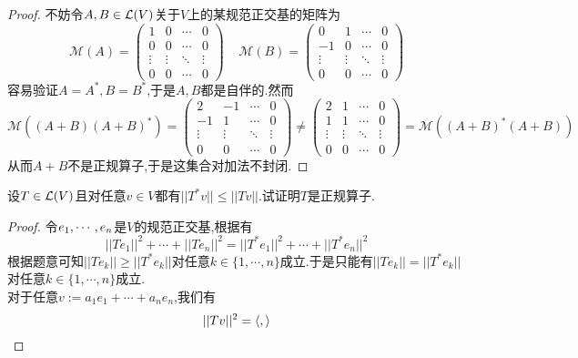 \documentclass{ctexart}
\begin{document}
\begin{proof}
    不妨令$A,B\in\mathcal{L}(V)$关于$V$上的某规范正交基的矩阵为
    \[\mathcal{M}(A)=\begin{pmatrix}
        1&0&\cdots&0\\
        0&0&\cdots&0\\
        \vdots&\vdots&\ddots&\vdots\\
        0&0&\cdots&0
    \end{pmatrix}\ \ \ \ \ 
    \mathcal{M}(B)=\begin{pmatrix}
        0&1&\cdots&0\\
        -1&0&\cdots&0\\
        \vdots&\vdots&\ddots&\vdots\\
        0&0&\cdots&0
    \end{pmatrix}\]
    容易验证$A=A^*,B=B^*$,于是$A,B$都是自伴的.然而
    \[\mathcal{M}((A+B)(A+B)^*)=
    \begin{pmatrix}
        2&-1&\cdots&0\\
        -1&1&\cdots&0\\
        \vdots&\vdots&\ddots&\vdots\\
        0&0&\cdots&0
    \end{pmatrix}\neq
    \begin{pmatrix}
        2&1&\cdots&0\\
        1&1&\cdots&0\\
        \vdots&\vdots&\ddots&\vdots\\
        0&0&\cdots&0
    \end{pmatrix}=\mathcal{M}((A+B)^*(A+B))\]
    从而$A+B$不是正规算子,于是这集合对加法不封闭.
\end{proof}
\begin{problem}[19.]
    设$T\in\mathcal{L}(V)$且对任意$v\in V$都有$||T^*v||\leqslant||Tv||$.试证明$T$是正规算子.
\end{problem}
\begin{proof}
    令${e}_1,\cdots,{e}_{n}$是$V$的规范正交基,根据有
    \[||Te_1||^2+\cdots+||Te_n||^2=||T^*e_1||^2+\cdots+||T^*e_n||^2\]
    根据题意可知$||Te_k||\geqslant||T^*e_k||$对任意$k\in\{1,\cdots,n\}$成立.于是只能有$||Te_k||=||T^*e_k||$对任意$k\in\{1,\cdots,n\}$成立.\\
    对于任意$v:=a_1e_1+\cdots+a_ne_n$,我们有
    \[||Tv||^2=\left\langle{},{}\right\rangle\]
\end{proof}
\end{document}
